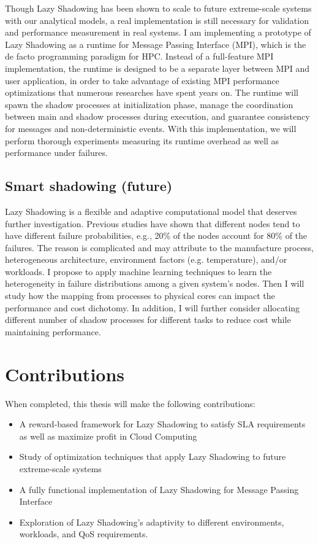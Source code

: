 Though Lazy Shadowing has been shown to scale to future extreme-scale systems with our analytical models, a real implementation 
is still necessary for validation and performance measurement in real systems. I am implementing a prototype of Lazy 
Shadowing as a runtime for Message Passing Interface (MPI), which is the de facto programming paradigm for HPC. Instead of 
a full-feature MPI implementation, the runtime is designed to be a separate layer between MPI and user application, in order 
to take advantage of existing MPI performance optimizations that numerous researches have spent years on. The runtime will spawn 
the shadow processes at initialization phase, manage the coordination between main and shadow processes during execution, 
and guarantee consistency for messages and non-deterministic events. With this implementation, we will perform thorough 
experiments measuring its runtime overhead as well as performance under failures.

\subsection{Smart shadowing (future)}
Lazy Shadowing is a flexible and adaptive computational model that deserves further investigation. Previous studies have shown that 
different nodes tend to have different failure probabilities, e.g., 20\% of the nodes account for 80\% of the failures. The reason 
is complicated and may attribute to the manufacture process, heterogeneous architecture, environment factors (e.g. temperature), 
and/or workloads. I propose to apply machine learning techniques to learn the heterogeneity in failure distributions among a given 
system's nodes. Then I will study how the mapping from processes to physical cores can impact the performance and cost dichotomy. 
In addition, I will further consider allocating different number of shadow processes for different tasks to reduce cost while 
maintaining performance. 

\section{Contributions}
When completed, this thesis will make the following contributions:

\begin{itemize}
\item A reward-based framework for Lazy Shadowing to satisfy SLA requirements as well as maximize profit in Cloud Computing
\item Study of optimization techniques that apply Lazy Shadowing to future extreme-scale systems
\item A fully functional implementation of Lazy Shadowing for Message Passing Interface
\item Exploration of Lazy Shadowing's adaptivity to different environments, workloads, and QoS requirements. 
\end{itemize}


